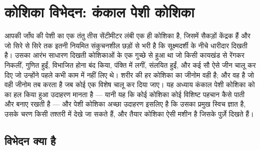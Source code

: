 \chapter{कोशिका विभेदन: कंकाल पेशी कोशिका}\label{ch:b2:cell-differentiation}

आपकी जाँघ की पेशी का एक तंतु तीस सेंटीमीटर लंबी एक ही कोशिका है, जिसमें
सैकड़ों केंद्रक हैं और जो सिरे से सिरे तक इतनी नियमित संकुचनशील छड़ों से
भरी है कि सूक्ष्मदर्शी के नीचे धारीदार दिखती है। उसका आरंभ साधारण दिखती
कोशिकाओं के एक गुच्छे से हुआ था जो किसी कायखंड से रेंगकर निकलीं, गुणित
हुईं, विभाजित होना बंद किया, पंक्ति में लगीं, संलयित हुईं, और कई सौ ऐसे
जीन चालू कर दिए जो उन्होंने पहले कभी काम में नहीं लिए थे। शरीर की हर
कोशिका का जीनोम वही है; और 
वह है जो वही जीनोम तब करता है जब कोई एक विशेष 
चालू कर दिया जाए। यह अध्याय कंकाल पेशी कोशिका को
\emph{} का हल किया हुआ उदाहरण मानता है --- यानी यह कि कोई कोशिका
कोई विशिष्ट पहचान कैसे पाती और बनाए रखती है --- और पेशी कोशिका अच्छा
उदाहरण इसलिए है कि उसका प्रमुख स्विच ज्ञात है, उसके चरण किसी तश्तरी में
देखे जा सकते हैं, और तैयार कोशिका ऐसी मशीन है जिसके पुर्ज़े दिखते हैं।

\section{विभेदन क्या है}

